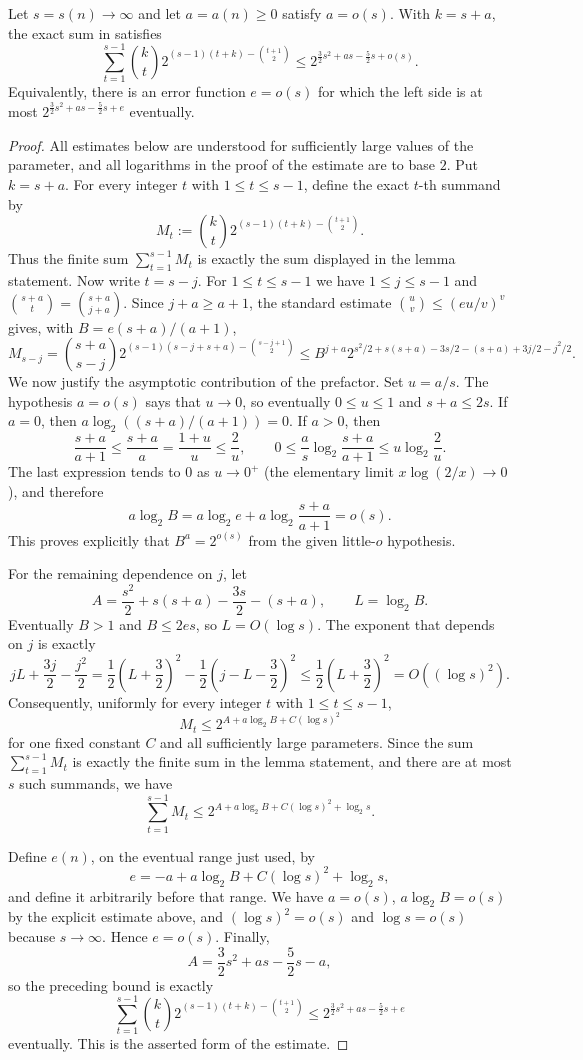 \begin{lemma}
Let $s=s(n)\to\infty$ and let $a=a(n)\geq0$ satisfy $a=o(s)$.  With
$k=s+a$, the exact sum in
 satisfies
\[
 \sum_{t=1}^{s-1}\binom kt
  2^{(s-1)(t+k)-\binom{t+1}{2}}
 \leq 2^{\frac32s^2+as-\frac52s+o(s)}.
\]
Equivalently, there is an error function $e=o(s)$ for which the left side
is at most $2^{\frac32s^2+as-\frac52s+e}$ eventually.
\end{lemma}
\begin{proof}
All estimates below are understood for sufficiently large values of the
parameter, and all logarithms in the proof of the estimate are to base $2$.
Put $k=s+a$.  For every integer $t$ with $1\leq t\leq s-1$, define the
exact $t$-th summand by
\[
 M_t:=\binom kt
 2^{(s-1)(t+k)-\binom{t+1}{2}}.
\]
Thus the finite sum $\sum_{t=1}^{s-1}M_t$ is exactly the sum displayed in
the lemma statement.  Now write $t=s-j$.  For $1\leq t\leq s-1$ we have
$1\leq j\leq s-1$ and
$\binom{s+a}{t}=\binom{s+a}{j+a}$.  Since $j+a\geq a+1$, the standard
estimate $\binom uv\leq(eu/v)^v$ gives, with
$B=e(s+a)/(a+1)$,
\[
 M_{s-j}=\binom{s+a}{s-j}
 2^{(s-1)(s-j+s+a)-\binom{s-j+1}{2}}
 \leq
 B^{j+a}
 2^{s^2/2+s(s+a)-3s/2-(s+a)+3j/2-j^2/2}.
\]
We now justify the asymptotic contribution of the prefactor.  Set
$u=a/s$.  The hypothesis $a=o(s)$ says that $u\to0$, so eventually
$0\leq u\leq1$ and $s+a\leq2s$.  If $a=0$, then
$a\log_2((s+a)/(a+1))=0$.  If $a>0$, then
\[
 \frac{s+a}{a+1}\leq\frac{s+a}{a}=\frac{1+u}{u}\leq\frac2u,
 \qquad
 0\leq \frac{a}{s}\log_2\frac{s+a}{a+1}
 \leq u\log_2\frac2u.
\]
The last expression tends to $0$ as $u\to0^+$ (the elementary limit
$x\log(2/x)\to0$), and therefore
\[
 a\log_2 B
 =a\log_2 e+a\log_2\frac{s+a}{a+1}=o(s).
\]
This proves explicitly that $B^a=2^{o(s)}$ from the given little-$o$
hypothesis.

For the remaining dependence on $j$, let
\[
 A=\frac{s^2}{2}+s(s+a)-\frac{3s}{2}-(s+a),
 \qquad L=\log_2 B.
\]
Eventually $B>1$ and $B\leq2es$, so $L=O(\log s)$.  The exponent that
depends on $j$ is exactly
\[
 jL+\frac{3j}{2}-\frac{j^2}{2}
 =\frac12\left(L+\frac32\right)^2
  -\frac12\left(j-L-\frac32\right)^2
 \leq \frac12\left(L+\frac32\right)^2
 =O((\log s)^2).
\]
Consequently, uniformly for every integer $t$ with $1\leq t\leq s-1$,
\[
 M_t\leq
 2^{A+a\log_2B+C(\log s)^2}
\]
for one fixed constant $C$ and all sufficiently large parameters.  Since
the sum $\sum_{t=1}^{s-1}M_t$ is exactly the finite sum in the lemma
statement, and there are at most $s$ such summands, we have
\[
 \sum_{t=1}^{s-1}M_t
 \leq
 2^{A+a\log_2B+C(\log s)^2+\log_2s}.
\]

Define $e(n)$, on the eventual range just used, by
\[
 e=-a+a\log_2B+C(\log s)^2+\log_2s,
\]
and define it arbitrarily before that range.  We have $a=o(s)$,
$a\log_2B=o(s)$ by the explicit estimate above, and
$(\log s)^2=o(s)$ and $\log s=o(s)$ because $s\to\infty$.  Hence
$e=o(s)$.  Finally,
\[
 A=\frac32s^2+as-\frac52s-a,
\]
so the preceding bound is exactly
\[
 \sum_{t=1}^{s-1}\binom kt
 2^{(s-1)(t+k)-\binom{t+1}{2}}
 \leq
 2^{\frac32s^2+as-\frac52s+e}
\]
eventually.  This is the asserted form of the estimate.
\end{proof}
